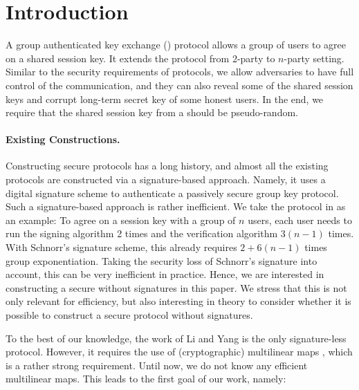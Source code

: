 \newcommand{\introGAKE}{\text{GAKE}\xspace}
\newcommand{\introAKE}{\text{AKE}\xspace}
\newcommand{\introNumSess}{s}
\newcommand{\introNumUser}{n}
\newcommand{\reduction}{\mathcal{R}}
\newcommand{\CCGJJ}{CCGJJ\xspace}


\section{Introduction}\label{sec:introduction}

A group authenticated key exchange (\introGAKE) protocol allows a group of users to agree on a shared session key. It extends the \introAKE protocol from 2-party to $n$-party setting. Similar to the security requirements of \introAKE protocols, we allow adversaries to have full control of the communication, and they can also reveal some of the shared session keys and corrupt long-term secret key of some honest users. 
In the end, we require that the shared session key from a \introGAKE should be pseudo-random.

\paragraph{Existing Constructions.}
Constructing secure \introGAKE protocols has a long history, and almost all the existing protocols \cite{CCS:BCPQ01,AC:BreChePoi01,EC:BreChePoi02,PQCRYPTO:ADGK19,JC:PanQiaRin22} are constructed via a signature-based approach. Namely, it uses a digital signature scheme to authenticate a passively secure group key protocol. Such a signature-based approach is rather inefficient. We take the protocol in \cite{JC:PanQiaRin22} as an example: To agree on a session key with a group of $n$ users, each user needs to run the signing algorithm 2 times and the verification algorithm $3(n-1)$ times. With Schnorr's signature scheme, this already requires $2+6(n-1)$ times group exponentiation. Taking the security loss of Schnorr's signature into account, this can be very inefficient in practice. Hence, we are interested in constructing a secure \introGAKE without signatures in this paper.
We stress that this is not only relevant for efficiency, but also interesting in theory to consider  whether it is possible to construct a secure \introGAKE protocol without signatures.

To the best of our knowledge, the work of Li and Yang \cite{CANS:LiYan13} is the only signature-less \introGAKE protocol. However, it requires the use of (cryptographic) multilinear maps \cite{EC:GarGenHal13}, which is a rather strong requirement. Until now, we do not know any efficient multilinear maps. 
This leads to the first goal of our work, namely:

